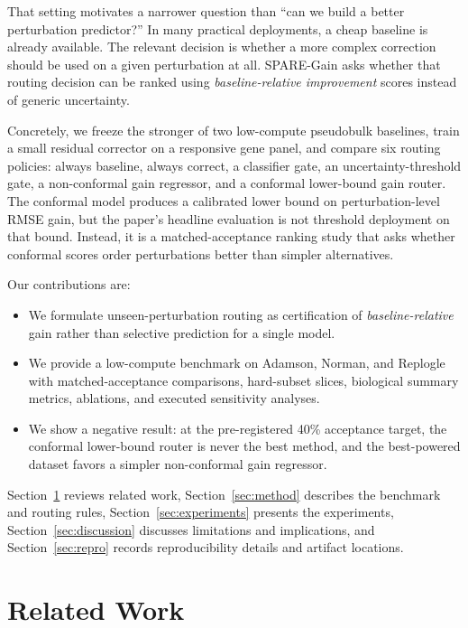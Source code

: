 \documentclass{article}
\begin{document}
That setting motivates a narrower question than ``can we build a better perturbation predictor?'' In many practical deployments, a cheap baseline is already available. The relevant decision is whether a more complex correction should be used on a given perturbation at all. SPARE-Gain asks whether that routing decision can be ranked using \emph{baseline-relative improvement} scores instead of generic uncertainty.

Concretely, we freeze the stronger of two low-compute pseudobulk baselines, train a small residual corrector on a responsive gene panel, and compare six routing policies: always baseline, always correct, a classifier gate, an uncertainty-threshold gate, a non-conformal gain regressor, and a conformal lower-bound gain router. The conformal model produces a calibrated lower bound on perturbation-level RMSE gain, but the paper's headline evaluation is not threshold deployment on that bound. Instead, it is a matched-acceptance ranking study that asks whether conformal scores order perturbations better than simpler alternatives.

Our contributions are:
\begin{itemize}
    \item We formulate unseen-perturbation routing as certification of \emph{baseline-relative} gain rather than selective prediction for a single model.
    \item We provide a low-compute benchmark on Adamson, Norman, and Replogle with matched-acceptance comparisons, hard-subset slices, biological summary metrics, ablations, and executed sensitivity analyses.
    \item We show a negative result: at the pre-registered 40\% acceptance target, the conformal lower-bound router is never the best method, and the best-powered dataset favors a simpler non-conformal gain regressor.
\end{itemize}

Section~\ref{sec:related} reviews related work, Section~\ref{sec:method} describes the benchmark and routing rules, Section~\ref{sec:experiments} presents the experiments, Section~\ref{sec:discussion} discusses limitations and implications, and Section~\ref{sec:repro} records reproducibility details and artifact locations.

\section{Related Work}
\label{sec:related}
\end{document}
